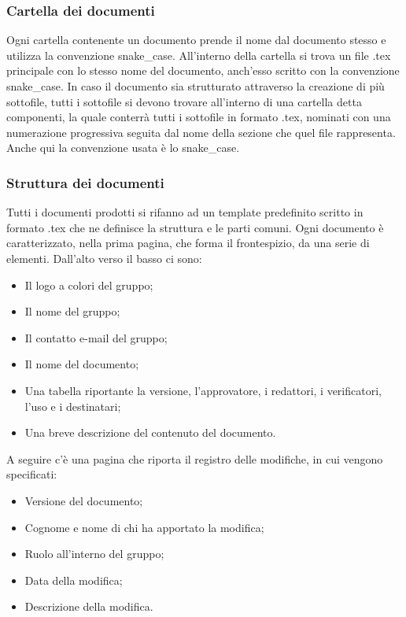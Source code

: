 \documentclass[../norme_di_progetto.tex]{subfiles}
\begin{document}
\subsubsection{Cartella dei documenti}
Ogni cartella contenente un documento prende il nome dal documento stesso e utilizza la convenzione snake\_case. All'interno della cartella si trova un file .tex principale con lo stesso nome del documento, anch'esso scritto con la convenzione snake\_case. In caso il documento sia strutturato attraverso la creazione di più sottofile, tutti i sottofile si devono trovare all'interno di una cartella detta componenti, la quale conterrà tutti i sottofile in formato .tex, nominati con una numerazione progressiva seguita dal nome della sezione che quel file rappresenta. Anche qui la convenzione usata è lo snake\_case.

\subsubsection{Struttura dei documenti}
Tutti i documenti prodotti si rifanno ad un template predefinito scritto in formato .tex che ne definisce la struttura e le parti comuni. Ogni documento è caratterizzato, nella prima pagina, che forma il frontespizio, da una serie di elementi. Dall'alto verso il basso ci sono:
\begin{itemize}
    \item Il logo a colori del gruppo;
    \item Il nome del gruppo;
    \item Il contatto e-mail del gruppo;
    \item Il nome del documento;
    \item Una tabella riportante la versione, l'approvatore, i redattori, i verificatori, l'uso e i destinatari;
    \item Una breve descrizione del contenuto del documento.
\end{itemize}
A seguire c'è una pagina che riporta il registro delle modifiche, in cui vengono specificati:
\begin{itemize}
    \item Versione del documento;
    \item Cognome e nome di chi ha apportato la modifica;
    \item Ruolo all'interno del gruppo;
    \item Data della modifica;
    \item Descrizione della modifica.
\end{itemize}
\end{document}
